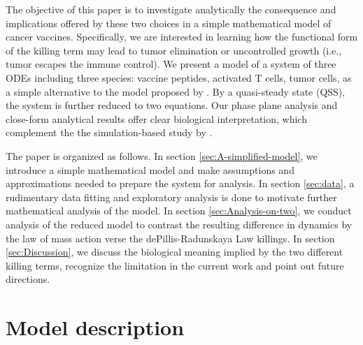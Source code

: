 \documentclass[review,authoryear]{elsarticle}
\begin{document}
The objective of this paper is to investigate analytically the consequence
and implications offered by these two choices in a simple mathematical
model of cancer vaccines. Specifically, we are interested in learning
how the functional form of the killing term may lead to tumor elimination
or uncontrolled growth (i.e., tumor escapes the immune control). We present
a model of a system of three ODEs
including three species: vaccine peptides, activated T cells, tumor
cells, as a simple alternative to the model proposed by \citet{Messan2021}. By a quasi-steady state (QSS), the system is further reduced
to two equations. Our phase plane analysis and close-form analytical
results offer clear biological interpretation, which complement the
the simulation-based study by \citet{Messan2021}. 

The paper is organized as follows. In section \ref{sec:A-simplified-model},
we introduce a simple mathematical model and make assumptions and approximations
needed to prepare the system for analysis. In section \ref{sec:data}, a rudimentary data fitting and exploratory analysis is done to motivate further mathematical analysis of the model. In section \ref{sec:Analysis-on-two},
we conduct analysis of the reduced model to contrast the resulting
difference in dynamics by the law of mass action verse the dePillis-Radunskaya
Law killings. In section \ref{sec:Discussion}, we discuss the biological
meaning implied by the two different killing terms, recognize the
limitation in the current work and point out future directions. 



\section{Model description \label{sec:A-simplified-model}}
\end{document}
